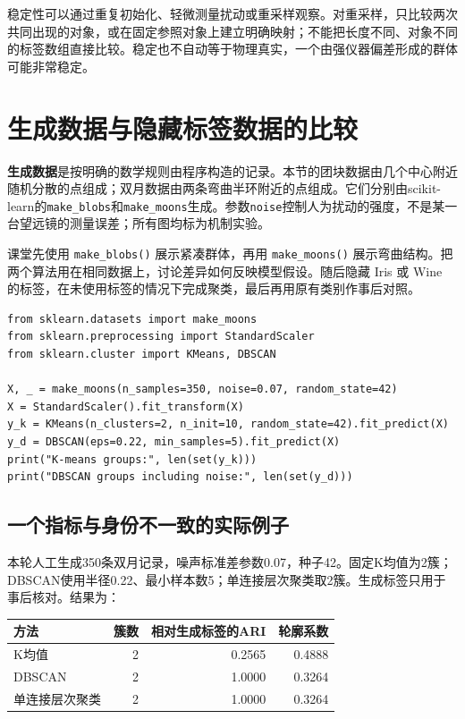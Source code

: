 稳定性可以通过重复初始化、轻微测量扰动或重采样观察。对重采样，只比较两次共同出现的对象，或在固定参照对象上建立明确映射；不能把长度不同、对象不同的标签数组直接比较。稳定也不自动等于物理真实，一个由强仪器偏差形成的群体可能非常稳定。

\section{生成数据与隐藏标签数据的比较}

\textbf{生成数据}是按明确的数学规则由程序构造的记录。本节的团块数据由几个中心附近随机分散的点组成；双月数据由两条弯曲半环附近的点组成。它们分别由scikit-learn的\texttt{make\_blobs}和\texttt{make\_moons}生成。参数\texttt{noise}控制人为扰动的强度，不是某一台望远镜的测量误差；所有图均标为机制实验。

课堂先使用 \texttt{make\_blobs()} 展示紧凑群体，再用 \texttt{make\_moons()} 展示弯曲结构。把两个算法用在相同数据上，讨论差异如何反映模型假设。随后隐藏 Iris 或 Wine 的标签，在未使用标签的情况下完成聚类，最后再用原有类别作事后对照。

\begin{lstlisting}[caption={两种聚类方法在相同输入上的比较}]
from sklearn.datasets import make_moons
from sklearn.preprocessing import StandardScaler
from sklearn.cluster import KMeans, DBSCAN

X, _ = make_moons(n_samples=350, noise=0.07, random_state=42)
X = StandardScaler().fit_transform(X)
y_k = KMeans(n_clusters=2, n_init=10, random_state=42).fit_predict(X)
y_d = DBSCAN(eps=0.22, min_samples=5).fit_predict(X)
print("K-means groups:", len(set(y_k)))
print("DBSCAN groups including noise:", len(set(y_d)))
\end{lstlisting}


\subsection{一个指标与身份不一致的实际例子}
本轮人工生成350条双月记录，噪声标准差参数0.07，种子42。固定K均值为2簇；DBSCAN使用半径0.22、最小样本数5；单连接层次聚类取2簇。生成标签只用于事后核对。结果为：
\begin{center}\small
\begin{tabular}{lrrr}\toprule
方法&簇数&相对生成标签的ARI&轮廓系数\\\midrule
K均值&2&0.2565&0.4888\\
DBSCAN&2&1.0000&0.3264\\
单连接层次聚类&2&1.0000&0.3264\\\bottomrule
\end{tabular}\end{center}

